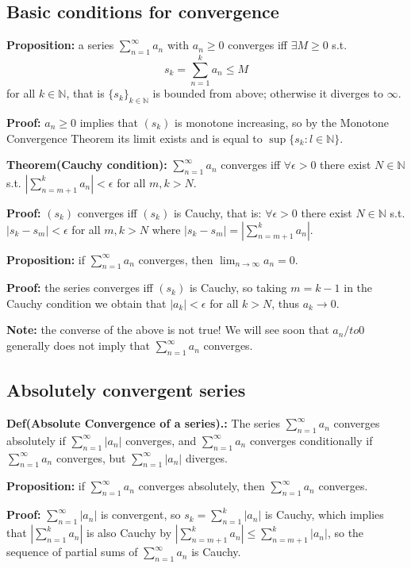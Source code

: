 \documentclass{article}
\begin{document}
\subsection{Basic conditions for convergence}
\textbf{Proposition:} a series $\sum_{n=1}^{\infty}{a_n}$  with $a_n\geq 0$ converges iff $\exists M\geq 0$ s.t.
\[
s_k=\sum_{n=1}^{k}{a_n}\leq M
\]
for all $k\in \mathbb{N}$, that is $\{s_k\}_{k\in \mathbb{N}}$ is bounded from above; otherwise it 
diverges to $\infty$.

\textbf{Proof:} $a_n\geq 0$ implies that $(s_k)$ is monotone increasing, so by the Monotone Convergence Theorem its limit exists and is equal to $\sup \{s_k:l\in \mathbb{N}\}$.

\textbf{Theorem(Cauchy condition):} $\sum_{n=1}^{\infty}{a_n}$ converges iff $\forall \epsilon>0$ there exist $N\in \mathbb{N}$ s.t. $|\sum_{n=m+1}^{k}{a_n}| < \epsilon$ for all $m,k>N$.

\textbf{Proof:} $(s_k)$ converges iff $(s_k)$ is Cauchy, that is: $\forall \epsilon > 0$ there exist $N\in \mathbb{N}$ s.t. $|s_k-s_m|<\epsilon$ for all $m,k>N$ where $|s_k-s_m|=|\sum_{n=m+1}^{k}{a_n}|$.


\textbf{Proposition:} if $\sum_{n=1}^{\infty}{a_n}$ converges, then $\lim_{n\to \infty}a_n=0$.

\textbf{Proof:} the series converges iff $(s_k)$ is Cauchy, so taking $m=k-1$ in the Cauchy condition we obtain that $|a_k|<\epsilon$ for all $k>N$, thus $a_k\to 0$.

\textbf{Note:} the converse of the above is not true! We will see soon that $a_n/to 0$ generally does not imply that $\sum_{n=1}^{\infty}{a_n}$ converges.

\subsection{Absolutely convergent series}

\textbf{Def(Absolute Convergence of a series).:} The series $\sum_{n=1}^{\infty}{a_n}$  converges absolutely if $\sum_{n=1}^{\infty}{|a_n|}$ converges, and $\sum_{n=1}^{\infty}{a_n}$ converges conditionally if $\sum_{n=1}^{\infty}{a_n}$ converges, but $\sum_{n=1}^{\infty}{|a_n|}$ diverges.

\textbf{Proposition:} if $\sum_{n=1}^{\infty}{a_n}$ converges absolutely, then $\sum_{n=1}^{\infty}{a_n}$ converges.

\textbf{Proof:} $\sum_{n=1}^{\infty}{|a_n|}$ is convergent, so $s_k=\sum_{n=1}^{k}{|a_n|}$ is Cauchy, which implies that $|\sum_{n=1}^{k}{a_n}|$ is also Cauchy by $|\sum_{n=m+1}^{k}{a_n}| \leq \sum_{n=m+1}^{k}{|a_n|}$, so the sequence of partial sums of $\sum_{n=1}^{\infty}{a_n}$ is Cauchy.
\end{document}
